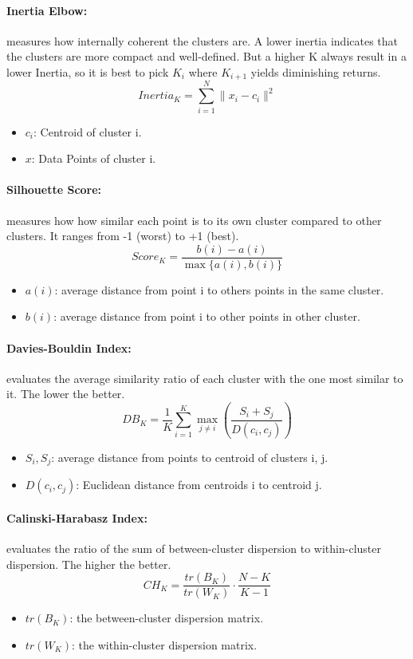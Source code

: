 \documentclass{report}
\begin{document}
\paragraph{Inertia Elbow:} measures how internally coherent the clusters are. A lower inertia 
indicates that the clusters are more compact and well-defined. But a higher K always result in a lower
Inertia, so it is best to pick $K_i$ where $K_{i+1}$ yields diminishing returns.
\[ Inertia_K = \sum_{i=1}^{N} \| x_i - c_i \|^2 \]
\begin{itemize}
    \item \( c_i \): Centroid of cluster i. 
    \item \( x \): Data Points of cluster i.
\end{itemize}

\paragraph{Silhouette Score:} measures how how similar each point is to its own cluster compared to 
other clusters. It ranges from -1 (worst) to +1 (best).
\[ Score_K = \frac{b(i) - a(i)}{\max\{a(i), b(i)\}} \]
\begin{itemize}
    \item \( a(i) \): average distance from point i to others points in the same cluster.
    \item \( b(i) \): average distance from point i to other points in other cluster.
\end{itemize}

\paragraph{Davies-Bouldin Index:}  evaluates the average similarity ratio of each cluster with the one 
most similar to it. The lower the better.
\[ DB_K = \frac{1}{K} \sum_{i=1}^{K} \max_{j \neq i} \left( \frac{S_i + S_j}{D(c_i, c_j)} \right) \]
\begin{itemize}
    \item \( S_i, S_j \): average distance from points to centroid of clusters i, j.
    \item \( D(c_i, c_j) \): Euclidean distance from centroids i to centroid j.
\end{itemize}

\paragraph{Calinski-Harabasz Index:}  evaluates the ratio of the sum of between-cluster dispersion to 
within-cluster dispersion. The higher the better.
\[ CH_K = \frac{tr(B_K)}{tr(W_K)} \cdot \frac{N - K}{K - 1} \]
\begin{itemize}
    \item \( tr(B_K) \): the between-cluster dispersion matrix.
    \item \( tr(W_K) \): the within-cluster dispersion matrix.
\end{itemize}
\end{document}
